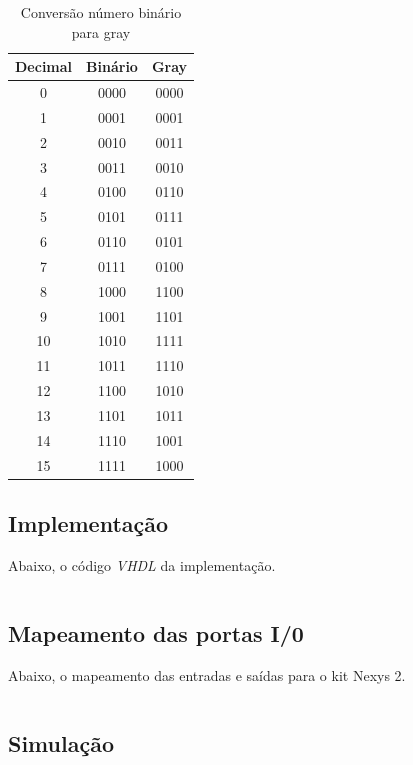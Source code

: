 \documentclass[12pt]{article}
\begin{document}
\begin{table}[!h]
\centering
\caption{Conversão número binário para gray}
\label{my-label}
\begin{tabular}{|c|c|c|}

\hline
Decimal & Binário & Gray   \\
\hline
0       & 0000    & 0000   \\
1       & 0001    & 0001   \\
2       & 0010    & 0011   \\
3       & 0011    & 0010   \\
4       & 0100    & 0110   \\
5       & 0101    & 0111   \\
6       & 0110    & 0101   \\
7       & 0111    & 0100   \\
8       & 1000    & 1100   \\
9       & 1001    & 1101   \\
10      & 1010    & 1111   \\
11      & 1011    & 1110   \\
12      & 1100    & 1010   \\
13      & 1101    & 1011   \\
14      & 1110    & 1001   \\
15      & 1111    & 1000   \\ \hline 
\end{tabular}
\end{table}

\subsection{Implementação}

Abaixo, o código \emph{VHDL} da implementação.

\inputminted{vhdl}{desafio1.vhd}


\subsection{Mapeamento das portas I/0}
\label{subsec:desafio1_map}

Abaixo, o mapeamento das entradas e saídas para o kit Nexys 2.

\inputminted{vhdl}{pins.ucf}

\subsection{Simulação}
\end{document}
